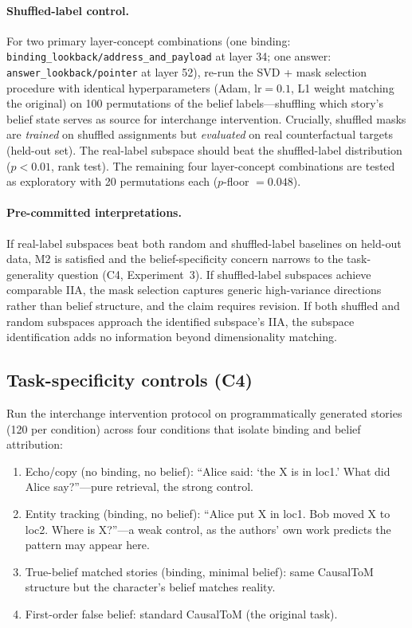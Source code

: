 \documentclass[11pt]{article}
\begin{document}
\paragraph{Shuffled-label control.} For two primary layer-concept combinations (one binding: \texttt{binding\_lookback/address\_and\_payload} at layer 34; one answer: \texttt{answer\_lookback/pointer} at layer 52), re-run the SVD + mask selection procedure with identical hyperparameters (Adam, $\text{lr} = 0.1$, L1 weight matching the original) on 100 permutations of the belief labels---shuffling which story's belief state serves as source for interchange intervention. Crucially, shuffled masks are \emph{trained} on shuffled assignments but \emph{evaluated} on real counterfactual targets (held-out set). The real-label subspace should beat the shuffled-label distribution ($p < 0.01$, rank test). The remaining four layer-concept combinations are tested as exploratory with 20 permutations each ($p$-floor $= 0.048$).

\paragraph{Pre-committed interpretations.} If real-label subspaces beat both random and shuffled-label baselines on held-out data, M2 is satisfied and the belief-specificity concern narrows to the task-generality question (C4, Experiment~3). If shuffled-label subspaces achieve comparable IIA, the mask selection captures generic high-variance directions rather than belief structure, and the claim requires revision. If both shuffled and random subspaces approach the identified subspace's IIA, the subspace identification adds no information beyond dimensionality matching.

\subsection{Task-specificity controls (C4)}

Run the interchange intervention protocol on programmatically generated stories (120 per condition) across four conditions that isolate binding and belief attribution:

\begin{enumerate}
\item Echo/copy (no binding, no belief): ``Alice said: `the X is in loc1.' What did Alice say?''---pure retrieval, the strong control.
\item Entity tracking (binding, no belief): ``Alice put X in loc1. Bob moved X to loc2. Where is X?''---a weak control, as the authors' own work predicts the pattern may appear here.
\item True-belief matched stories (binding, minimal belief): same CausalToM structure but the character's belief matches reality.
\item First-order false belief: standard CausalToM (the original task).
\end{enumerate}
\end{document}
